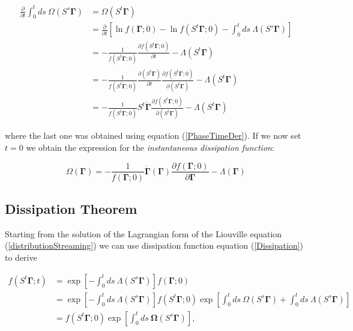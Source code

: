 \documentclass[a4paper,12pt,nofootinbib]{article}
\begin{document}
\begin{equation}
\begin{aligned}
  \frac{\partial}{\partial t}\int_0^t ds\ \Omega(S^s  \bm{\Gamma}) &= \Omega(S^t \bm{\Gamma})\\
  &=\frac{\partial}{\partial t}[\ln{f(\bm{\Gamma};0)}-\ln{f(S^t\bm{\Gamma};0)}
-\int_0^t ds \ \Lambda(S^s \bm{\Gamma})
]\\
&=-\frac{1}{f(S^t\bm{\Gamma};0)}\frac{\partial f(S^t\bm{\Gamma};0)}{\partial t}-\Lambda(S^t \bm{\Gamma})\\
&=-\frac{1}{f(S^t\bm{\Gamma};0)}\frac{\partial( S^t \bm{\Gamma})}{\partial t}\frac{\partial f(S^t\bm{\Gamma};0)}{\partial(S^t \bm{\Gamma})}-\Lambda(S^t \bm{\Gamma})\\
&=-\frac{1}{f(S^t\bm{\Gamma};0)}S^t\dot{\bm{\Gamma}}
\frac{\partial f(S^t\bm{\Gamma};0)}{\partial(S^t \bm{\Gamma})}-\Lambda(S^t \bm{\Gamma})
\end{aligned}
\end{equation}

where the last one was obtained using equation (\ref{PhaseTimeDer}). 
If we now set $t=0$ we obtain the expression for the \textit{instantaneous dissipation function}:

\begin{equation}
  \Omega(\bm{\Gamma})=-\frac{1}{f(\bm{\Gamma};0)}\dot{\bm{\Gamma}}(\bm{\Gamma})\frac{\partial{f(\bm{\Gamma};0)}}{\partial{\bm{\Gamma}}}-\Lambda(\bm{\Gamma})
\end{equation}

\subsection{Dissipation Theorem}

Starting from the solution of the Lagrangian form of the Liouville equation (\ref{distributionStreaming}) we can use dissipation function equation (\ref{Dissipation}) to derive

\begin{equation}
\begin{aligned}
  f(S^t\bm{\Gamma};t) &= \exp[-\int_0^t ds\ \Lambda(S^s\bm{\Gamma})]f(\bm{\Gamma};0)\\
  &=\exp[-\int_0^t ds\ \Lambda(S^s\bm{\Gamma})]f(S^t \bm{\Gamma};0) \exp[\int_0^t ds\ \Omega(S^s \bm{\Gamma}) + \int_0^t ds\ \Lambda(S^s\bm{\Gamma})]\\
  &=f(S^t \bm{\Gamma};0) \exp[\int_0^t ds\ \bm{\Omega}(S^s \bm{\Gamma})],
\end{aligned}
\end{equation}
\end{document}
